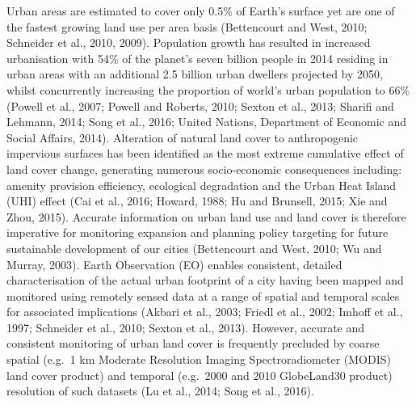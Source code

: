 \documentclass[]{book}
\begin{document}
Urban areas are estimated to cover only 0.5\% of Earth's surface yet are
one of the fastest growing land use per area basis (Bettencourt and
West, 2010; Schneider et al., 2010, 2009). Population growth has
resulted in increased urbanisation with 54\% of the planet's seven
billion people in 2014 residing in urban areas with an additional 2.5
billion urban dwellers projected by 2050, whilst concurrently increasing
the proportion of world's urban population to 66\% (Powell et al., 2007;
Powell and Roberts, 2010; Sexton et al., 2013; Sharifi and Lehmann,
2014; Song et al., 2016; United Nations, Department of Economic and
Social Affairs, 2014). Alteration of natural land cover to anthropogenic
impervious surfaces has been identified as the most extreme cumulative
effect of land cover change, generating numerous socio-economic
consequences including: amenity provision efficiency, ecological
degradation and the Urban Heat Island (UHI) effect (Cai et al., 2016;
Howard, 1988; Hu and Brunsell, 2015; Xie and Zhou, 2015). Accurate
information on urban land use and land cover is therefore imperative for
monitoring expansion and planning policy targeting for future
sustainable development of our cities (Bettencourt and West, 2010; Wu
and Murray, 2003). Earth Observation (EO) enables consistent, detailed
characterisation of the actual urban footprint of a city having been
mapped and monitored using remotely sensed data at a range of spatial
and temporal scales for associated implications (Akbari et al., 2003;
Friedl et al., 2002; Imhoff et al., 1997; Schneider et al., 2010; Sexton
et al., 2013). However, accurate and consistent monitoring of urban land
cover is frequently precluded by coarse spatial (e.g.~1 km Moderate
Resolution Imaging Spectroradiometer (MODIS) land cover product) and
temporal (e.g.~2000 and 2010 GlobeLand30 product) resolution of such
datasets (Lu et al., 2014; Song et al., 2016).
\end{document}
